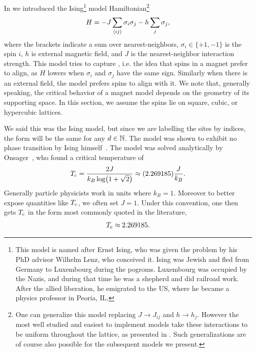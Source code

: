 In  we introduced the Ising\footnote{This
model is named after Ernst Ising, who was given the problem by his
PhD advisor Wilhelm Lenz, who conceived it. Ising was Jewish and
fled from Germany to Luxembourg during the pogroms. Luxembourg was
occupied by the Nazis, and during that time he was a shepherd and did
railroad work. After the allied liberation, he emigrated to the US,
where he became a physics professor in Peoria, IL.} model 
Hamiltonian\footnote{One can generalize this model replacing
$J\to J_{ij}$ and $h\to h_j$. However the most well studied and easiest
to implement models take these interactions to be uniform throughout
the lattice, as presented in . Such generalizations
are of course also possible for the subsequent models we present.}
\begin{equation}\label{eq:ising}
H=-J\sum_{\ev{i j}} \sigma_i \sigma_j-h \sum_j
\sigma_j,
\end{equation}
where the brackets indicate a sum over nearest-neighbors,
$\sigma_i\in\{+1,-1\}$ is the spin $i$, $h$ is 
external magnetic field, and $J$ is the
nearest-neighbor interaction strength. 
This model tries to capture , i.e. the
idea that spins in a magnet prefer to align, as $H$ lowers when
$\sigma_i$ and $\sigma_j$ have the same sign. Similarly when there
is an external field, the model prefers spins to align with it.
We note that, generally speaking, the critical behavior of a magnet model
depends on the geometry of its supporting space. In this section, we assume the
spins lie on square, cubic, or hypercubic lattices.

We said this was the  
Ising model, but since we are labelling the sites by indices, the form
will be the same for any $d\in\mathbb{N}$. The  model was shown to
exhibit no phase transition by Ising himself~\cite{ising_beitrag_1924}.
The  model was solved analytically by 
Onsager~\cite{onsager_crystal_1944}, who found a critical temperature of
\begin{equation}\label{eq:onsagerTc}
T_{\rm c}=\frac{2 J}{k_B \log (1+\sqrt{2})}\approx(2.269185) \frac{J}{k_B}.
\end{equation}
Generally particle physicists work in units where $k_B=1$. Moreover
to better expose quantities like $T_{\rm c}$, we often set $J=1$. Under this
convention, one then gets $T_{\rm c}$ in the form most commonly quoted
in the literature,
\begin{equation}
T_{\rm c}\approx2.269185.
\end{equation}

